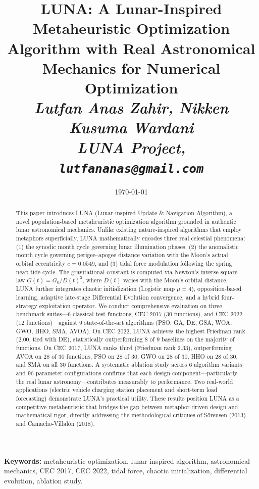 \documentclass[11pt,a4paper]{article}
\title{\vspace{-2cm}\textbf{\color{blue!40!black}\Large LUNA: A Lunar-Inspired Metaheuristic Optimization Algorithm with Real Astronomical Mechanics for Numerical Optimization}\\[6pt]\large\textit{Lutfan Anas Zahir, Nikken Kusuma Wardani\\LUNA Project, \texttt{lutfananas@gmail.com}}}
\date{\today}
\begin{document}
\maketitle
\thispagestyle{fancy}

\begin{abstract}
\noindent
This paper introduces LUNA (Lunar-inspired Update \& Navigation Algorithm), a novel population-based metaheuristic optimization algorithm grounded in authentic lunar astronomical mechanics. Unlike existing nature-inspired algorithms that employ metaphors superficially, LUNA mathematically encodes three real celestial phenomena: (1) the synodic month cycle governing lunar illumination phases, (2) the anomalistic month cycle governing perigee--apogee distance variation with the Moon's actual orbital eccentricity $e=0.0549$, and (3) tidal force modulation following the spring--neap tide cycle. The gravitational constant is computed via Newton's inverse-square law $G(t) = G_0 / D(t)^2$, where $D(t)$ varies with the Moon's orbital distance. LUNA further integrates chaotic initialization (Logistic map $\mu=4$), opposition-based learning, adaptive late-stage Differential Evolution convergence, and a hybrid four-strategy exploitation operator. We conduct comprehensive evaluation on three benchmark suites---6 classical test functions, CEC 2017 (30 functions), and CEC 2022 (12 functions)---against 9 state-of-the-art algorithms (PSO, GA, DE, GSA, WOA, GWO, HHO, SMA, AVOA). On CEC 2022, LUNA achieves the highest Friedman rank (2.00, tied with DE), statistically outperforming 8 of 9 baselines on the majority of functions. On CEC 2017, LUNA ranks third (Friedman rank 2.33), outperforming AVOA on 28 of 30 functions, PSO on 28 of 30, GWO on 28 of 30, HHO on 28 of 30, and SMA on all 30 functions. A systematic ablation study across 6 algorithm variants and 96 parameter configurations confirms that each design component---particularly the real lunar astronomy---contributes measurably to performance. Two real-world applications (electric vehicle charging station placement and short-term load forecasting) demonstrate LUNA's practical utility. These results position LUNA as a competitive metaheuristic that bridges the gap between metaphor-driven design and mathematical rigor, directly addressing the methodological critiques of S\"orensen (2013) and Camacho-Villal\'on (2018).
\end{abstract}

\vspace{0.5em}
\noindent\textbf{Keywords:} metaheuristic optimization, lunar-inspired algorithm, astronomical mechanics, CEC 2017, CEC 2022, tidal force, chaotic initialization, differential evolution, ablation study.
\end{document}
